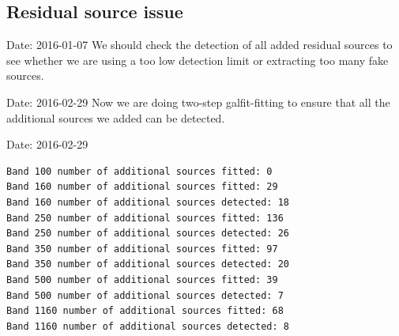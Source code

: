 \documentclass[11pt,a4paper]{article}
\begin{document}
\subsection{Residual source issue}

\textcolor{green!90!black!60!orange}{Date: 2016-01-07}
We should check the detection of all added residual sources to see whether we are using a too low detection limit or extracting too many fake sources. 

\textcolor{green!90!black!60!orange}{Date: 2016-02-29}
Now we are doing two-step galfit-fitting to ensure that all the additional sources we added can be detected. 

\textcolor{green!90!black!60!orange}{Date: 2016-02-29}
\begin{lstlisting}[language=bash]
Band 100 number of additional sources fitted: 0
Band 160 number of additional sources fitted: 29
Band 160 number of additional sources detected: 18
Band 250 number of additional sources fitted: 136
Band 250 number of additional sources detected: 26
Band 350 number of additional sources fitted: 97
Band 350 number of additional sources detected: 20
Band 500 number of additional sources fitted: 39
Band 500 number of additional sources detected: 7
Band 1160 number of additional sources fitted: 68
Band 1160 number of additional sources detected: 8
\end{lstlisting}
\end{document}
